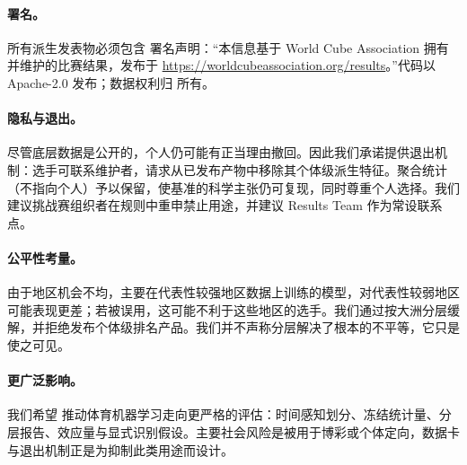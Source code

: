 \paragraph{署名。}所有派生发表物必须包含 \wca{} 署名声明：“本信息基于 World Cube Association 拥有并维护的比赛结果，发布于 \url{https://worldcubeassociation.org/results}。”代码以 Apache-2.0 发布；数据权利归 \wca{} 所有。

\paragraph{隐私与退出。}尽管底层数据是公开的，个人仍可能有正当理由撤回。因此我们承诺提供退出机制：选手可联系维护者，请求从已发布产物中移除其个体级派生特征。聚合统计（不指向个人）予以保留，使基准的科学主张仍可复现，同时尊重个人选择。我们建议挑战赛组织者在规则中重申禁止用途，并建议 \wca{} Results Team 作为常设联系点。

\paragraph{公平性考量。}由于地区机会不均，主要在代表性较强地区数据上训练的模型，对代表性较弱地区可能表现更差；若被误用，这可能不利于这些地区的选手。我们通过按大洲分层缓解，并拒绝发布个体级排名产品。我们并不声称分层解决了根本的不平等，它只是使之可见。

\paragraph{更广泛影响。}我们希望 \wcabench{} 推动体育机器学习走向更严格的评估：时间感知划分、冻结统计量、分层报告、效应量与显式识别假设。主要社会风险是被用于博彩或个体定向，数据卡与退出机制正是为抑制此类用途而设计。
